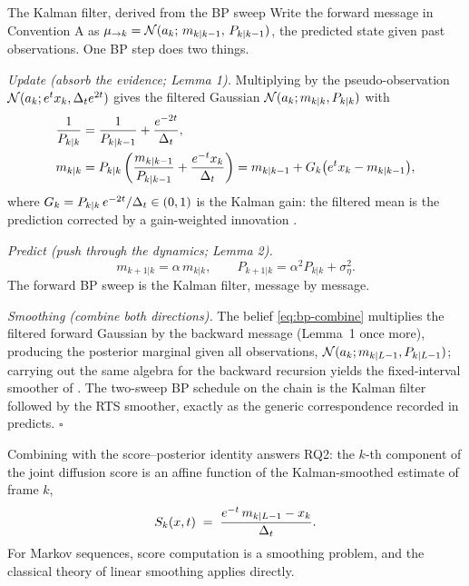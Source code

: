\begin{toolbox}{The Kalman filter, derived from the BP sweep}
Write the forward message in Convention A as
$\mu_{\to k} = \mathcal{N}(a_k;\, m_{k|k-1},\, P_{k|k-1})$, the predicted state
given past observations. One BP step does two things.

\emph{Update (absorb the evidence; Lemma 1).} Multiplying by the
pseudo-observation $\mathcal{N}(a_k; e^t x_k, \Delta_t e^{2t})$ gives the filtered
Gaussian $\mathcal{N}(a_k; m_{k|k}, P_{k|k})$ with
\begin{align*}
  \frac{1}{P_{k|k}} &= \frac{1}{P_{k|k-1}} + \frac{e^{-2t}}{\Delta_t},\\
  m_{k|k} &= P_{k|k} \left( \frac{m_{k|k-1}}{P_{k|k-1}}
        + \frac{e^{-t} x_k}{\Delta_t} \right)
  = m_{k|k-1} + G_k \big( e^{t} x_k - m_{k|k-1} \big),
\end{align*}
where $G_k = P_{k|k}\, e^{-2t}/\Delta_t \in (0,1)$ is the Kalman gain: the
filtered mean is the prediction corrected by a gain-weighted innovation
\citep{kalman1960new}.

\emph{Predict (push through the dynamics; Lemma 2).}
\begin{equation*}
  m_{k+1|k} = \alpha\, m_{k|k},
  \qquad
  P_{k+1|k} = \alpha^2 P_{k|k} + \sigma_\eta^2 .
\end{equation*}
The forward BP sweep is the Kalman filter, message by message.

\emph{Smoothing (combine both directions).} The belief
\eqref{eq:bp-combine} multiplies the filtered forward Gaussian by the
backward message (Lemma~1 once more), producing the posterior marginal
given all observations, $\mathcal{N}(a_k; m_{k|L-1}, P_{k|L-1})$; carrying out
the same algebra for the backward recursion yields the fixed-interval
smoother of \citet{rauch1965maximum}. The two-sweep BP schedule on the
chain is the Kalman filter followed by the RTS smoother, exactly as the
generic correspondence recorded in \compendium{} predicts.
\hfill$\square$
\end{toolbox}

Combining with the score--posterior identity answers RQ2: the $k$-th
component of the joint diffusion score is an affine function of the
Kalman-smoothed estimate of frame $k$,
\begin{equation}
  S_k(x, t)
  \;=\; \frac{e^{-t}\, m_{k|L-1} - x_k}{\Delta_t} .
  \label{eq:bp-score-kalman}
\end{equation}
For Markov sequences, score computation is a smoothing problem, and the
classical theory of linear smoothing applies directly.

